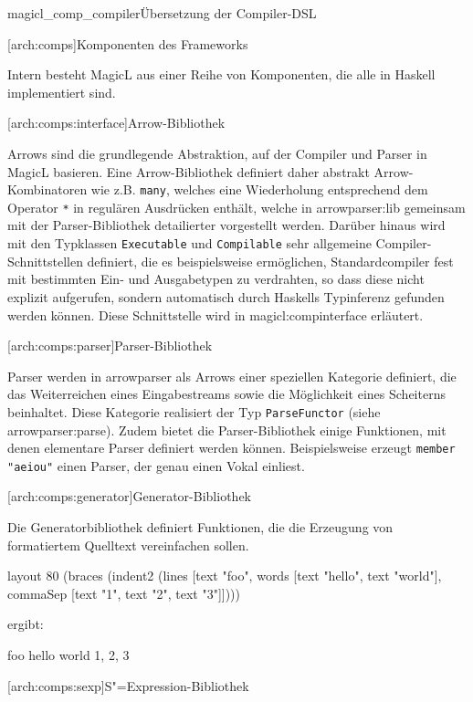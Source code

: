 \documentclass[12pt, a4paper, bibgerm]{scrbook}
\newcommand\icode[1]{\lstinline?#1?}
\newcommand\lsection{}
\newcommand\lsubsection{}
\newcommand\cref{}
\newcommand\sref{}
\newcommand\fig{}
\newcommand{\sees}[1]{(siehe \sref{#1})}
\newcommand{\sexp}{S"=Expression}
\begin{document}
\fig{magicl_comp_compiler}{Übersetzung der Compiler-DSL}

\lsection[arch:comps]{Komponenten des Frameworks}

Intern besteht MagicL aus einer Reihe von Komponenten, die alle in
Haskell implementiert sind.

\lsubsection[arch:comps:interface]{Arrow-Bibliothek}

Arrows sind die grundlegende Abstraktion, auf der Compiler und Parser in
MagicL basieren. Eine Arrow-Bibliothek definiert daher abstrakt
Arrow-Kombinatoren wie z.B. \icode{many}, welches eine Wiederholung
entsprechend dem Operator \icode{*} in regulären Ausdrücken enthält,
welche in \sref{arrowparser:lib} gemeinsam mit der Parser-Bibliothek
detailierter vorgestellt werden.  Darüber hinaus wird mit den Typklassen
\icode{Executable} und \icode{Compilable} sehr allgemeine
Compiler-Schnittstellen definiert, die es beispielsweise ermöglichen,
Standardcompiler fest mit bestimmten Ein- und Ausgabetypen zu
verdrahten, so dass diese nicht explizit aufgerufen, sondern automatisch
durch Haskells Typinferenz gefunden werden können. Diese Schnittstelle
wird in \sref{magicl:compinterface} erläutert.

\lsubsection[arch:comps:parser]{Parser-Bibliothek}

Parser werden in \cref{arrowparser} als Arrows einer speziellen
Kategorie definiert, die das Weiterreichen eines Eingabestreams sowie
die Möglichkeit eines Scheiterns beinhaltet. Diese Kategorie realisiert
der Typ \icode{ParseFunctor} \sees{arrowparser:parse}. Zudem bietet
die Parser-Bibliothek einige Funktionen, mit denen elementare Parser
definiert werden können. Beispielsweise erzeugt \icode{member "aeiou"}
einen Parser, der genau einen Vokal einliest. 

\lsubsection[arch:comps:generator]{Generator-Bibliothek}

Die Generatorbibliothek definiert Funktionen, die die Erzeugung von
formatiertem Quelltext vereinfachen sollen.

\begin{code}
layout 80 (braces 
           (indent2 
            (lines [text "foo",
                    words [text "hello", text "world"],
                    commaSep [text "1", text "2", text "3"]])))

ergibt:

{foo
  hello world
  1, 2, 3}
\end{code}

\lsubsection[arch:comps:sexp]{\sexp{}-Bibliothek}
\end{document}
